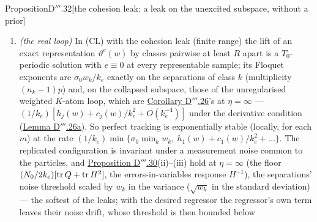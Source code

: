 \begin{thm}{Proposition}{D$'''$.32}[the cohesion leak: a leak on the unexcited subspace, without a
prior]
\begin{enumerate}[label=\textup{(\roman*)}]
    quasi-statically along the curve, the twins' amplitude difference $\Delta\alpha$ contracts at the rate
    \[
      \sigma_0\psi(\Delta\alpha^2/(G_\alpha R^2))\cdot\frac{(w_ka'_k + w_la'_l)^2}{w_ka'^2_k + w_la'^2_l},\qquad
      a' := \dd a/\dd\alpha,
    \]
    so they merge, for unsaturated twins on the time scale
    $G_\alpha R^2e^{\Delta\alpha^2/(2G_\alpha R^2)}/(\sigma_0(w_k + w_l)\Delta\alpha^2)$
    ($\Delta\alpha^2\gg G_\alpha R^2$). A third class within reach of one twin can win: twins need not merge, and a
    degenerate exact representation can be a saddle of $J^{\mathrm{coh}}_m$ that the flow leaves toward a biased
    configuration (Numerics (I)). A dead class moves under the attraction of the live ones, a Gaussian mixture in its
    coordinates whose weights carry the live classes' amplitude coordinates ($w_le^{-\alpha_l^2/(2G_\alpha R^2)}$);
    when the components are farther apart than a few $R$ its local minima lie near them, where it becomes a twin of a
    live class --- on the time scale $R^2e^{d^2/(2R^2)}/(\sigma_0wd^2)$, $d\gg R$ its distance from the nearest live
    class and $w$ that class's mass. With the finite range, dead and duplicated classes farther than $R$ from the
    others persist.
  \item \emph{(the real loop)} In \textup{(CL)} with the cohesion leak (finite range) the lift of an exact
    representation $\vartheta^e(w)$ by classes pairwise at least $R$ apart is a $T_0$-periodic solution with
    $e\equiv0$ at every representable sample; its Floquet exponents are $\sigma_0w_k/k_e$ exactly on the separations
    of class $k$ (multiplicity $(n_k - 1)p$) and, on the collapsed subspace, those of the unregularised weighted
    $K$-atom loop, which are \hyperref[res:thmDppp:26]{Corollary D$'''$.26}'s at $\eta = \infty$ ---
    $(1/k_e)[h_j(w) + c_j(w)/k_e^2 + O(k_e^{-4})]$ under the derivative condition
    (\hyperref[res:thmDppp:26a]{Lemma D$'''$.26a}). So perfect tracking is exponentially stable (locally, for each
    $m$) at the rate $(1/k_e)\min\{\sigma_0\min_kw_k,\ h_1(w) + c_1(w)/k_e^2 + \dots\}$. The replicated configuration
    is invariant under a measurement noise common to the particles, and
    \hyperref[res:thmDppp:30]{Proposition D$'''$.30}(ii)--(iii) hold at $\eta = \infty$ (the floor
    $(N_0/2k_e)[\operatorname{tr} Q + \operatorname{tr} H^2]$, the errors-in-variables response $H^{-1}$), the separations' noise threshold
    scaled by $w_k$ in the variance ($\sqrt{w_k}$ in the standard deviation) --- the softest of the leaks; with the
    desired regressor the regressor's own term leaves their noise drift, whose threshold is then bounded below

\end{enumerate}
\end{thm}
